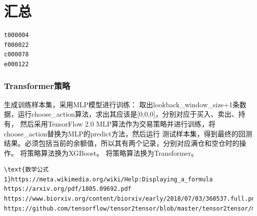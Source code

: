 \documentclass{article}
\begin{document}
\section{汇总}
\begin{lstlisting}
t000004
f000022
c000078
e000122
\end{lstlisting}




\subsubsection{Transformer策略}
生成训练样本集，采用MLP模型进行训练：\newline
取出lookback\_window\_size+1条数据，运行choose\_action算法，求出其应该是[0,0,0]，分别对应于买入、卖出、持有，
然后采用TensorFlow 2.0 MLP算法作为交易策略并进行训练，将choose\_action替换为MLP的predict方法，然后运行
测试样本集，得到最终的回测结果。必须包括当前的余额值，所以其有两个记录，分别对应满仓和空仓时的操作。\newline
将策略算法换为XGBoost。\newline
将策略算法换为Transformer。\newline













\begin{lstlisting}
\text{数学公式1}https://meta.wikimedia.org/wiki/Help:Displaying_a_formula
https://arxiv.org/pdf/1805.09692.pdf
https://www.biorxiv.org/content/biorxiv/early/2018/07/03/360537.full.pdf
https://github.com/tensorflow/tensor2tensor/blob/master/tensor2tensor/models/evolved_transformer.py#L66

\end{lstlisting}





\newpage




\appendix
\end{document}
